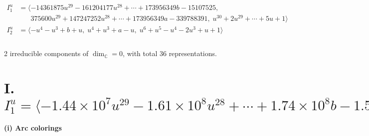 \documentclass[1p]{elsarticle_modified}
\theoremstyle{definition}
\begin{document}
\begin{align*}
I^u_{1}&=\langle 
-14361875 u^{29}-161204177 u^{28}+\cdots+173956349 b-15107525,\\
\phantom{I^u_{1}}&\phantom{= \langle  }375600 u^{29}+147247252 u^{28}+\cdots+173956349 a-339788391,\;u^{30}+2 u^{29}+\cdots+5 u+1\rangle \\
I^u_{2}&=\langle 
- u^4- u^3+b+u,\;u^4+u^3+a- u,\;u^6+u^5- u^4-2 u^3+u+1\rangle \\
\\
\end{align*}
\raggedright * 2 irreducible components of $\dim_{\mathbb{C}}=0$, with total 36 representations.\\
\newpage
\renewcommand{\arraystretch}{1}
\centering \section*{I. $I^u_{1}= \langle -1.44\times10^{7} u^{29}-1.61\times10^{8} u^{28}+\cdots+1.74\times10^{8} b-1.51\times10^{7},\;3.76\times10^{5} u^{29}+1.47\times10^{8} u^{28}+\cdots+1.74\times10^{8} a-3.40\times10^{8},\;u^{30}+2 u^{29}+\cdots+5 u+1 \rangle$}
\flushleft \textbf{(i) Arc colorings}\\
\end{document}
